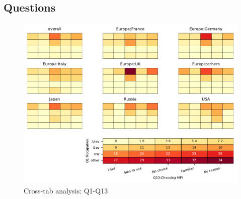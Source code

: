 
\subsection{Questions}


\begin{figure}
\begin{center}
\includegraphics[width=12cm]{../pdfs/Q1-Q13.pdf}
\caption{Cross-tab analysis: Q1-Q13}
\label{fig:Q1-Q13}
\end{center}
\end{figure}
